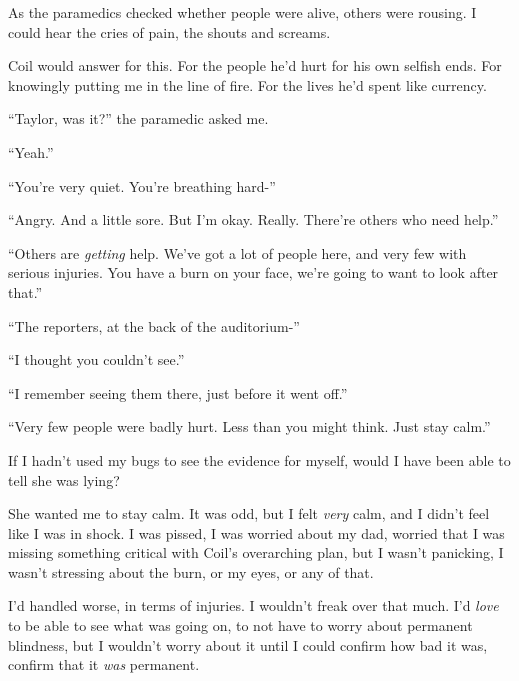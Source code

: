 As the paramedics checked whether people were alive, others were rousing.  I could hear the cries of pain, the shouts and screams.



Coil would answer for this.  For the people he'd hurt for his own selfish ends.  For knowingly putting me in the line of fire.  For the lives he'd spent like currency.



``Taylor, was it?'' the paramedic asked me.



``Yeah.''



``You're very quiet.  You're breathing hard-''



``Angry.  And a little sore.  But I'm okay.  Really.  There're others who need help.''



``Others are \emph{getting} help.  We've got a lot of people here, and very few with serious injuries.  You have a burn on your face, we're going to want to look after that.''



``The reporters, at the back of the auditorium-''



``I thought you couldn't see.''



``I remember seeing them there, just before it went off.''



``Very few people were badly hurt.  Less than you might think.  Just stay calm.''



If I hadn't used my bugs to see the evidence for myself, would I have been able to tell she was lying?



She wanted me to stay calm.  It was odd, but I felt \emph{very} calm, and I didn't feel like I was in shock.  I was pissed, I was worried about my dad, worried that I was missing something critical with Coil's overarching plan, but I wasn't panicking, I wasn't stressing about the burn, or my eyes, or any of that.



I'd handled worse, in terms of injuries.  I wouldn't freak over that much.  I'd\emph{ love} to be able to see what was going on, to not have to worry about permanent blindness, but I wouldn't worry about it until I could confirm how bad it was, confirm that it \emph{was} permanent.



